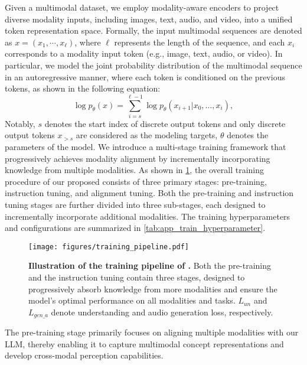 Given a multimodal dataset, we employ modality-aware encoders to project diverse modality inputs, including images, text, audio, and video, into a unified token representation space. Formally, the input multimodal sequences are denoted as  $x = (x_1, \cdots, x_\ell)$, where $\ell$ represents the length of the sequence, and each $x_i$ corresponds to a modality input token (e.g., image, text, audio, or video).  In particular, we model the joint probability distribution of the multimodal sequence in an autoregressive manner, where each token is conditioned on the previous tokens, as shown in the following equation:
\begin{equation}
\log p_{\theta} (x) = \sum_{i = s}^{\ell-1} \log p_{\theta}(x_{i+1} | x_{0}, \dots, x_{i}),
\end{equation}
Notably, $s$ denotes the start index of discrete output tokens and only discrete output tokens $x_{>s}$ are considered as the modeling targets, $\theta$ denotes the parameters of the model.
We introduce a multi-stage training framework that progressively achieves modality alignment by incrementally incorporating knowledge from multiple modalities. As shown in \cref{fig-pretrain_pipeline}, the overall training procedure of our proposed \method consists of three primary stages: pre-training, instruction tuning, and alignment tuning.  Both the pre-training and instruction tuning stages are further divided into three sub-stages, each designed to incrementally incorporate additional modalities. The training hyperparameters and configurations are summarized in \cref{tab:app_train_hyperparameter}.


\begin{figure}[t]
    \centering
    \texttt{[image: figures/training\_pipeline.pdf]}
    \caption{
    \textbf{Illustration of the training pipeline of \method.}
    Both the pre-training and the instruction tuning contain three stages, designed to progressively absorb knowledge from more modalities and ensure the model's optimal performance on all modalities and tasks. $L_{un}$ and $L_{gen\_a}$ denote understanding and audio generation loss, respectively.
    }
    \label{fig-pretrain_pipeline}
\end{figure}

The pre-training stage primarily focuses on aligning multiple modalities with our \method LLM, thereby enabling it to capture multimodal concept representations and develop cross-modal perception capabilities.

